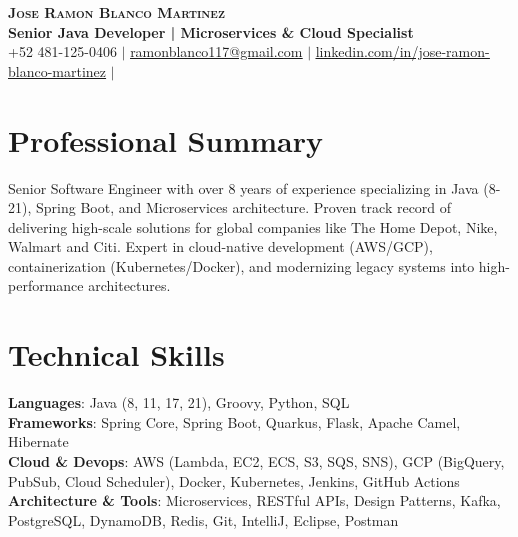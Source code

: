 \documentclass[letterpaper,11pt]{article}
\begin{document}

\begin{center}
    \textbf{\Huge \scshape Jose Ramon Blanco Martinez} \\ \vspace{1pt}
    \textbf{Senior Java Developer | Microservices \& Cloud Specialist} \\ \vspace{1pt}
    \small +52 481-125-0406 $|$ \href{mailto:x@x.com}{\underline{ramonblanco117@gmail.com}} $|$ 
    \href{https://www.linkedin.com/in/jose-ramon-blanco-martinez/}{\underline{linkedin.com/in/jose-ramon-blanco-martinez}} $|$
\end{center}


\section{Professional Summary}
Senior Software Engineer with over 8 years of experience specializing in Java (8-21), Spring Boot, and Microservices architecture. Proven track record of delivering high-scale solutions for global companies like The Home Depot, Nike, Walmart and Citi. Expert in cloud-native development (AWS/GCP), containerization (Kubernetes/Docker), and modernizing legacy systems into high-performance architectures.

\section{Technical Skills}
 \begin{itemize}[leftmargin=0.15in, label={}]
    \small{\item{
     \textbf{Languages}{: Java (8, 11, 17, 21), Groovy, Python, SQL} \\
     \textbf{Frameworks}{: Spring Core, Spring Boot, Quarkus, Flask, Apache Camel, Hibernate} \\
     \textbf{Cloud \& Devops}{: AWS (Lambda, EC2, ECS, S3, SQS, SNS), GCP (BigQuery, PubSub, Cloud Scheduler), Docker, Kubernetes, Jenkins, GitHub Actions} \\
     \textbf{Architecture \& Tools}{: Microservices, RESTful APIs, Design Patterns, Kafka, PostgreSQL, DynamoDB, Redis, Git, IntelliJ, Eclipse, Postman} \\
    }}
 \end{itemize}
\end{document}
